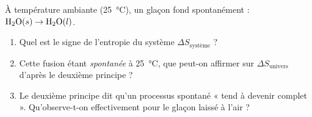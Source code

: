 \documentclass[11pt,a4paper]{article}
\newcommand{\dS}{\Delta S}
\begin{document}
\begin{exercice}
À température ambiante (\SI{25}{\celsius}), un glaçon fond spontanément : $\ce{H2O}(s) \rightarrow \ce{H2O}(l)$.
\begin{enumerate}[label=\alph*),leftmargin=2em,topsep=2pt,itemsep=2pt]
  \item Quel est le signe de l'entropie du système $\dS_{\text{système}}$ ?
  \item Cette fusion étant \emph{spontanée} à \SI{25}{\celsius}, que peut-on affirmer sur
        $\dS_{\text{univers}}$ d'après le deuxième principe ?
  \item Le deuxième principe dit qu'un processus spontané « tend à devenir complet ». Qu'observe-t-on
        effectivement pour le glaçon laissé à l'air ?
\end{enumerate}
\end{exercice}
\end{document}
